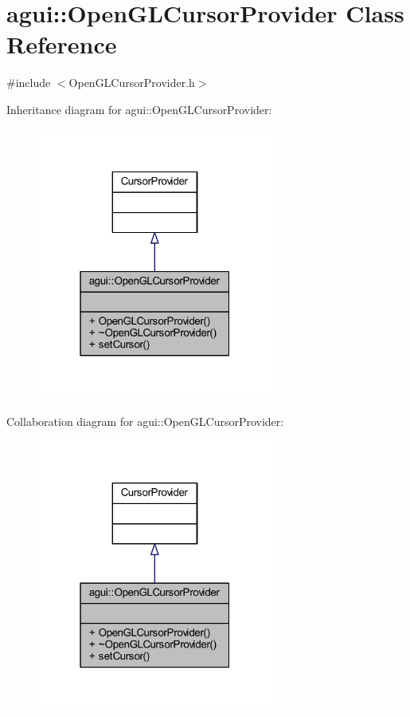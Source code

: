 \hypertarget{classagui_1_1_open_g_l_cursor_provider}{}\section{agui\+:\+:Open\+G\+L\+Cursor\+Provider Class Reference}
\label{classagui_1_1_open_g_l_cursor_provider}


{\ttfamily \#include $<$Open\+G\+L\+Cursor\+Provider.\+h$>$}



Inheritance diagram for agui\+:\+:Open\+G\+L\+Cursor\+Provider\+:\nopagebreak
\begin{figure}[H]
\begin{center}
\leavevmode
\includegraphics[width=220pt]{classagui_1_1_open_g_l_cursor_provider__inherit__graph}
\end{center}
\end{figure}


Collaboration diagram for agui\+:\+:Open\+G\+L\+Cursor\+Provider\+:\nopagebreak
\begin{figure}[H]
\begin{center}
\leavevmode
\includegraphics[width=220pt]{classagui_1_1_open_g_l_cursor_provider__coll__graph}
\end{center}
\end{figure}
